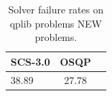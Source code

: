 \begin{table}
\centering
\caption{Solver failure rates on qplib problems NEW problems.}
\label{t-qplib problems NEW-failure}
\begin{tabular}{lcc}
\toprule
 SCS-3.0 &  OSQP \\
\midrule
   38.89 & 27.78 \\
\bottomrule
\end{tabular}
\end{table}
